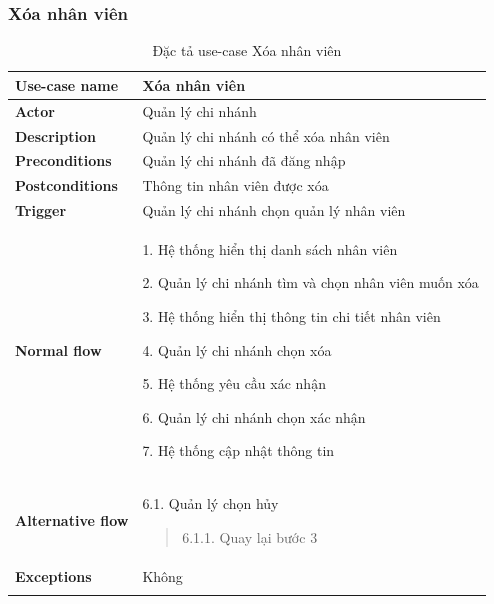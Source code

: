 \subsubsection{Xóa nhân viên}
{
    \setlength\extrarowheight{6pt}
    \begin{longtable}{| p{} | p{} |}
        \hline
        \textbf{Use-case name}
         &
        Xóa nhân viên
        \\
        \hline
        \textbf{Actor}
         &
        Quản lý chi nhánh
        \\
        \hline
        \textbf{Description}
         &
        Quản lý chi nhánh có thể xóa nhân viên
        \\
        \hline
        \textbf{Preconditions}
         &
        Quản lý chi nhánh đã đăng nhập
        \\
        \hline
        \textbf{Postconditions}
         &
        Thông tin nhân viên được xóa
        \\
        \hline
        \textbf{Trigger}
         &
        Quản lý chi nhánh chọn quản lý nhân viên
        \\
        \hline
        \begin{flushleft}
            \textbf{Normal flow}
        \end{flushleft}
         &
        1. Hệ thống hiển thị danh sách nhân viên

        2. Quản lý chi nhánh tìm và chọn nhân viên muốn xóa

        3. Hệ thống hiển thị thông tin chi tiết nhân viên

        4. Quản lý chi nhánh chọn xóa

        5. Hệ thống yêu cầu xác nhận

        6. Quản lý chi nhánh chọn xác nhận

        7. Hệ thống cập nhật thông tin
        \\
        \hline
        \textbf{Alternative flow}
         &
        6.1. Quản lý chọn hủy
        \begin{quote}
            6.1.1. Quay lại bước 3
        \end{quote}
        \\
        \hline
        \textbf{Exceptions}
         &
        Không
        \\
        \hline
        \caption{Đặc tả use-case Xóa nhân viên}
    \end{longtable}
}


